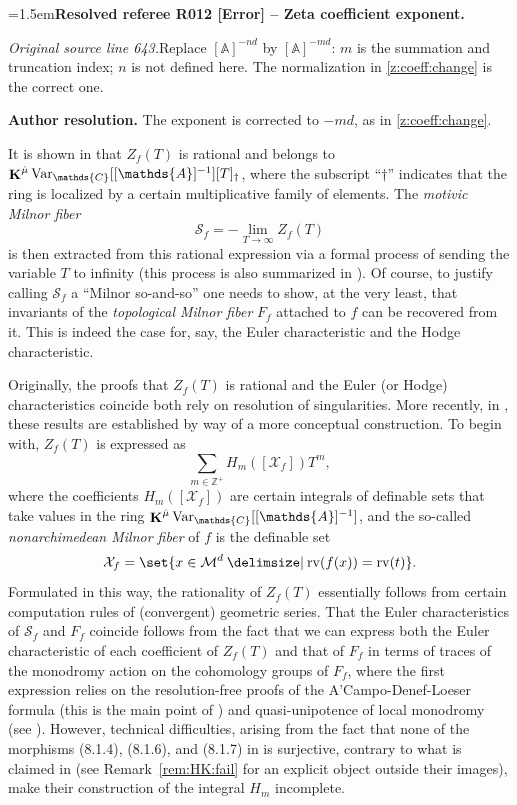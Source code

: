 \documentclass[12pt]{amsart}
\newcommand{\ResolvedRefereeRemark}[5]{%
  \par\medskip\begingroup\normalfont\small\color{gray}%
  \emergencystretch=1.5em\noindent\textbf{Resolved referee R#1 [#2] -- #3.}\par\nobreak\noindent #4\par
  \medskip\color{ResolutionGreen}\noindent\textbf{Author resolution.} #5\par
  \endgroup\medskip
}
\newcommand{\memph}[1]{{\color{magenta}\emph{#1}}}
\theoremstyle{plain}
\theoremstyle{definition}
\theoremstyle{remark}
\numberwithin{equation}{section}
\theoremstyle{plain}
\newcommand{\MM}{\mdl M}
\newcommand{\Z}{\mathds{Z}}
\newcommand{\A}{\mathds{A}}
\newcommand{\C}{\mathds{C}}
\newcommand{\0}{\emptyset}
\newcommand{\mdl}[1]{\mathcal{#1}}  %
\newcommand{\limplies}{\rightarrow}
\providecommand\given{}
\newcommand\SetSymbol[1][]{%
\nonscript \: #1 \vert
\allowbreak
\nonscript\:
\mathopen{}}
\renewcommand\given{\SetSymbol[\delimsize]}
\DeclareMathOperator{\rv}{rv}
\DeclareMathOperator{\ggk}{\mathbf{K}}
\newcommand{\var}{\textup{Var}}
\newcommand{\gmv}{\ggk^{\hat \mu}\var_{\C}}
\begin{document}
\ResolvedRefereeRemark{012}{Error}{Zeta coefficient exponent}{%
\textit{Original source line 643.}\quad Replace $[\A]^{-nd}$ by $[\A]^{-md}$: $m$ is the summation and truncation index; $n$ is not defined here. The normalization in \eqref{z:coeff:change} is the correct one.
}{The exponent is corrected to $-md$, as in \eqref{z:coeff:change}.}
It is  shown in \cite{denefloeser:arc, den:loe:2002} that $Z_f(T)$ is rational and belongs to $\gmv[[\A]^{-1}][T]_\dag$, where the subscript ``$\dag$'' indicates that the ring is localized by  a certain multiplicative family of elements. The \memph{motivic Milnor fiber}
\[
\mathscr S_{f} = - \lim_{T \limplies \infty} Z_{f}(T)
\]
is then extracted from this rational expression via a formal process of sending the variable $T$ to infinity (this process is also summarized in \cite[\S~8.4]{hru:loe:lef}). Of course, to justify calling $\mathscr S_{f}$ a ``Milnor so-and-so'' one needs to show, at the very least, that invariants of the \memph{topological Milnor fiber} $F_{f}$ attached to $f$ can be recovered from it.  This is indeed the case for, say, the Euler characteristic and the Hodge characteristic.

Originally,  the proofs that $Z_f(T)$ is rational and  the Euler (or Hodge) characteristics coincide both rely on resolution of singularities.  More recently, in \cite{hru:loe:lef}, these results are established by way of a more conceptual construction. To begin with, $Z_{f}(T)$ is expressed as
\begin{equation*}\label{intro:zeta:mot}
\sum_{m \in \Z^+} H_m([\mdl X_f]) T^m,
\end{equation*}
where the coefficients $H_m([\mdl X_f])$ are certain integrals of definable sets that take values in the ring $\gmv [[\A]^{-1}]$,  and the so-called \memph{nonarchimedean Milnor fiber} of $f$ is the definable set
\[
\mdl X_f = \set{x \in \MM^d \given \rv(f(x)) = \rv(t) }.
\]
Formulated in this way, the rationality of $Z_{f}(T)$ essentially follows from  certain computation rules of (convergent) geometric series. That the Euler characteristics of $\mathscr S_{f}$ and $F_{f}$ coincide follows from the fact that we can express both the Euler characteristic of each coefficient of $Z_{f}(T)$ and that of $F_{f}$ in terms of traces of the monodromy action on the cohomology groups of $F_{f}$, where the first expression relies on  the resolution-free proofs of the A'Campo-Denef-Loeser formula (this is the main point of \cite{hru:loe:lef}) and quasi-unipotence of local monodromy (see \cite[Remark~8.5.5]{hru:loe:lef}). However, technical difficulties, arising from the fact that none of the morphisms (8.1.4), (8.1.6), and (8.1.7) in \cite{hru:loe:lef} is surjective, contrary to what is claimed in \cite[Proposition~10.10(2)]{hrushovski:kazhdan:integration:vf} (see Remark~\ref{rem:HK:fail} for an explicit object outside their images), make their construction of the integral $H_m$ incomplete.
\end{document}
